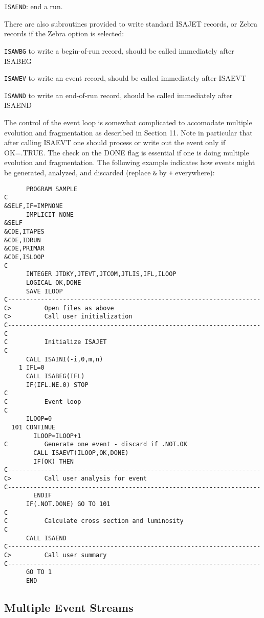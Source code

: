       \verb|ISAEND|: end a run.

\noindent There are also subroutines provided to write standard ISAJET
records, or Zebra records if the Zebra option is selected:

      \verb|ISAWBG| to write a begin-of-run record, should be called
immediately after ISABEG

      \verb|ISAWEV| to write an event record, should be called
immediately after ISAEVT

      \verb|ISAWND| to write an end-of-run record, should be called
immediately after ISAEND

      The control of the event loop is somewhat complicated to
accomodate multiple evolution and fragmentation as described in
Section 11. Note in particular that after calling ISAEVT one should
process or write out the event only if OK=.TRUE. The check on the DONE
flag is essential if one is doing multiple evolution and
fragmentation. The following example indicates how events might be
generated, analyzed, and discarded (replace \verb|&| by \verb|+|
everywhere):
\begin{verbatim}
      PROGRAM SAMPLE
C
&SELF,IF=IMPNONE
      IMPLICIT NONE
&SELF
&CDE,ITAPES
&CDE,IDRUN
&CDE,PRIMAR
&CDE,ISLOOP
C
      INTEGER JTDKY,JTEVT,JTCOM,JTLIS,IFL,ILOOP
      LOGICAL OK,DONE
      SAVE ILOOP
C--------------------------------------------------------------------- 
C>         Open files as above
C>         Call user initialization
C--------------------------------------------------------------------- 
C
C          Initialize ISAJET
C
      CALL ISAINI(-i,0,m,n)
    1 IFL=0
      CALL ISABEG(IFL)
      IF(IFL.NE.0) STOP
C
C          Event loop
C
      ILOOP=0
  101 CONTINUE
        ILOOP=ILOOP+1
C          Generate one event - discard if .NOT.OK
        CALL ISAEVT(ILOOP,OK,DONE)
        IF(OK) THEN
C--------------------------------------------------------------------- 
C>         Call user analysis for event
C--------------------------------------------------------------------- 
        ENDIF
      IF(.NOT.DONE) GO TO 101
C
C          Calculate cross section and luminosity
C
      CALL ISAEND
C--------------------------------------------------------------------- 
C>         Call user summary
C--------------------------------------------------------------------- 
      GO TO 1
      END
\end{verbatim}

\subsection{Multiple Event Streams}

